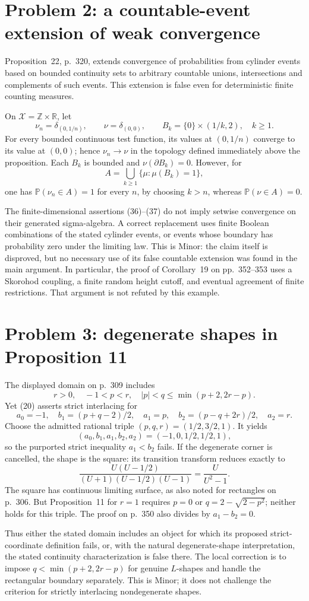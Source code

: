 \documentclass[10pt]{article}
\begin{document}
\section*{Problem 2: a countable-event extension of weak convergence}
Proposition 22, p. 320, extends convergence of probabilities from cylinder events based on bounded continuity sets to arbitrary countable unions, intersections and complements of such events. This extension is false even for deterministic finite counting measures.\par
On \(\mathcal X=\mathbb Z\times\mathbb R\), let \[\nu_n=\delta_{(0,1/n)},\qquad \nu=\delta_{(0,0)},\qquad
 B_k=\{0\}\times(1/k,2),\quad k\ge1 .\] For every bounded continuous test function, its values at \((0,1/n)\) converge to its value at \((0,0)\); hence \(\nu_n\to\nu\) in the topology defined immediately above the proposition. Each \(B_k\) is bounded and \(\nu(\partial B_k)=0\). However, for \[A=\bigcup_{k\ge1}\{\mu:\mu(B_k)=1\},\] one has \(\mathbb P(\nu_n\in A)=1\) for every \(n\), by choosing \(k>n\), whereas \(\mathbb P(\nu\in A)=0\).\par
The finite-dimensional assertions (36)–(37) do not imply setwise convergence on their generated sigma-algebra. A correct replacement uses finite Boolean combinations of the stated cylinder events, or events whose boundary has probability zero under the limiting law. This is Minor: the claim itself is disproved, but no necessary use of its false countable extension was found in the main argument. In particular, the proof of Corollary 19 on pp. 352–353 uses a Skorohod coupling, a finite random height cutoff, and eventual agreement of finite restrictions. That argument is not refuted by this example.\par
\section*{Problem 3: degenerate shapes in Proposition 11}
The displayed domain on p. 309 includes \[r>0,\quad -1<p<r,\quad |p|<q\le\min(p+2,2r-p).\] Yet (20) asserts strict interlacing for \[a_0=-1,\quad b_1=(p+q-2)/2,\quad a_1=p,\quad
 b_2=(p-q+2r)/2,\quad a_2=r.\] Choose the admitted rational triple \((p,q,r)=(1/2,3/2,1)\). It yields \[(a_0,b_1,a_1,b_2,a_2)=(-1,0,1/2,1/2,1),\] so the purported strict inequality \(a_1<b_2\) fails. If the degenerate corner is cancelled, the shape is the square: its transition transform reduces exactly to \[\frac{U(U-1/2)}{(U+1)(U-1/2)(U-1)}
 =\frac{U}{U^2-1}.\] The square has continuous limiting surface, as also noted for rectangles on p. 306. But Proposition 11 for \(r=1\) requires \(p=0\) or \(q=2-\sqrt{2-p^2}\); neither holds for this triple. The proof on p. 350 also divides by \(a_1-b_2=0\).\par
Thus either the stated domain includes an object for which its proposed strict-coordinate definition fails, or, with the natural degenerate-shape interpretation, the stated continuity characterization is false there. The local correction is to impose \(q<\min(p+2,2r-p)\) for genuine \(L\)-shapes and handle the rectangular boundary separately. This is Minor; it does not challenge the criterion for strictly interlacing nondegenerate shapes.\par
\end{document}
